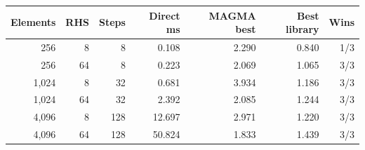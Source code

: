 \begin{tabular}{rrrrrrr}
\toprule
Elements & RHS & Steps & Direct ms & MAGMA best & Best library & Wins\\
\midrule
256 & 8 & 8 & 0.108 & 2.290 & 0.840 & 1/3\\
256 & 64 & 8 & 0.223 & 2.069 & 1.065 & 3/3\\
1,024 & 8 & 32 & 0.681 & 3.934 & 1.186 & 3/3\\
1,024 & 64 & 32 & 2.392 & 2.085 & 1.244 & 3/3\\
4,096 & 8 & 128 & 12.697 & 2.971 & 1.220 & 3/3\\
4,096 & 64 & 128 & 50.824 & 1.833 & 1.439 & 3/3\\
\bottomrule
\end{tabular}
